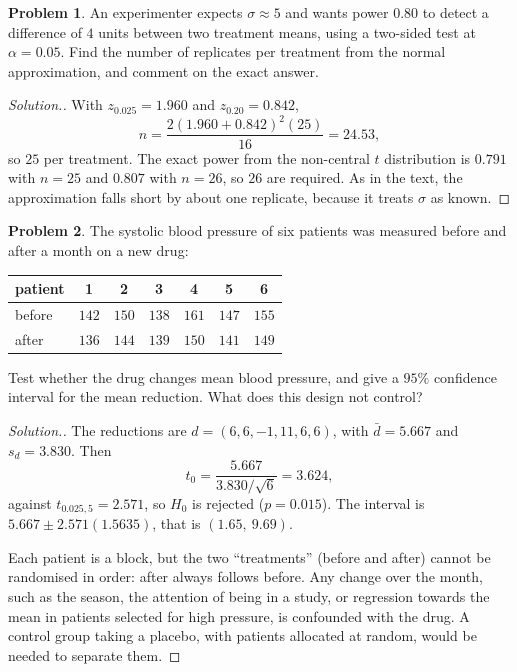 \documentclass[11pt,a4paper]{article}
\numberwithin{equation}{section}
\theoremstyle{definition}
\newtheorem{problemx}{Problem}[subsection]
\newenvironment{problem}{\begin{problemx}}{\end{problemx}}
\newenvironment{solution}
  {\renewcommand{\qedsymbol}{}\begin{proof}[\textit{Solution}.]}
  {\end{proof}}
\begin{document}
\begin{problem}
An experimenter expects $\sigma \approx 5$ and wants power $0.80$ to detect a difference of $4$ units between two treatment means, using a two-sided test at
$\alpha = 0.05$. Find the number of replicates per treatment from the normal approximation, and comment on the exact answer.
\end{problem}

\begin{solution}
With $z_{0.025} = 1.960$ and $z_{0.20} = 0.842$,
\[
n = \frac{2(1.960 + 0.842)^2(25)}{16} = 24.53 ,
\]
so $25$ per treatment. The exact power from the non-central $t$ distribution is $0.791$ with $n = 25$ and $0.807$ with $n = 26$, so $26$ are required. As in the
text, the approximation falls short by about one replicate, because it treats $\sigma$ as known.
\end{solution}

\begin{problem}
The systolic blood pressure of six patients was measured before and after a month on a new drug:
\begin{center}
\begin{tabular}{l|cccccc}
patient & 1 & 2 & 3 & 4 & 5 & 6 \\
\hline
before & $142$ & $150$ & $138$ & $161$ & $147$ & $155$ \\
after & $136$ & $144$ & $139$ & $150$ & $141$ & $149$
\end{tabular}
\end{center}
Test whether the drug changes mean blood pressure, and give a $95\%$ confidence interval for the mean reduction. What does this design not control?
\end{problem}

\begin{solution}
The reductions are $d = (6, 6, -1, 11, 6, 6)$, with $\bar d = 5.667$ and $s_d = 3.830$. Then
\[
t_0 = \frac{5.667}{3.830/\sqrt6} = 3.624 ,
\]
against $t_{0.025,5} = 2.571$, so $H_0$ is rejected ($p = 0.015$). The interval is $5.667 \pm 2.571(1.5635)$, that is $(1.65,\ 9.69)$.

Each patient is a block, but the two ``treatments'' (before and after) cannot be randomised in order: after always follows before. Any change
over the month, such as the season, the attention of being in a study, or regression towards the mean in patients selected for high
pressure, is confounded with the drug. A control group taking a placebo, with patients allocated at random, would be needed to separate
them.
\end{solution}
\end{document}
